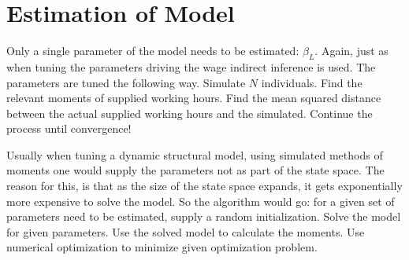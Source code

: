 \section{Estimation of Model}

Only a single parameter of the model needs to be estimated: $\beta_L$. Again, just as when tuning the parameters driving the wage indirect inference is used. The parameters are tuned the following way. Simulate $N$ individuals. Find the relevant moments of supplied working hours. Find the mean squared distance between the actual supplied working hours and the simulated. Continue the process until convergence!

Usually when tuning a dynamic structural model, using simulated methods of moments one would supply the parameters not as part of the state space. The reason for this, is that as the size of the state space expands, it gets exponentially more expensive to solve the model. So the algorithm would go: for a given set of parameters need to be estimated, supply a random initialization. Solve the model for given parameters. Use the solved model to calculate the moments. Use numerical optimization to minimize given optimization problem.